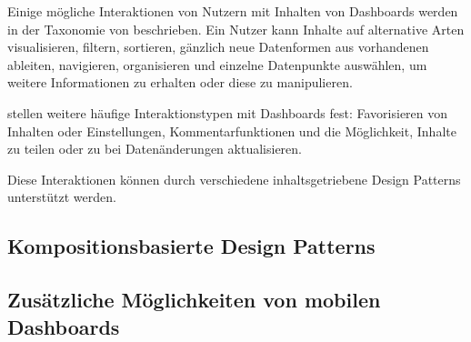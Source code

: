 Einige mögliche Interaktionen von Nutzern mit Inhalten von Dashboards werden in der Taxonomie von \citeauthor[S. 1]{Heer.InteractiveDynamicsVisualAnalysis.2012} beschrieben.
Ein Nutzer kann Inhalte auf alternative Arten visualisieren, filtern, sortieren, gänzlich neue Datenformen aus vorhandenen ableiten, navigieren, organisieren und einzelne Datenpunkte auswählen, um weitere Informationen zu erhalten oder diese zu manipulieren.

\citeauthor[S. 25]{MarcusHomannVassilenaBanovaPaulOelbermannHolgerWittgesandHelmutKrcmar.TowardsUserInterfaceComponentsforDashboardApplicationsonSmartphones.2013} stellen weitere häufige Interaktionstypen mit Dashboards fest:
Favorisieren von Inhalten oder Einstellungen, Kommentarfunktionen und die Möglichkeit, Inhalte zu teilen oder zu bei Datenänderungen aktualisieren.

Diese Interaktionen können durch verschiedene inhaltsgetriebene Design Patterns unterstützt werden.

\subsection{Kompositionsbasierte Design Patterns}\label{subsec:conposition-design-patterns}

\subsection{Zusätzliche Möglichkeiten von mobilen Dashboards}\label{subsec:additional-capabilities-of-mobile-dashboards}

